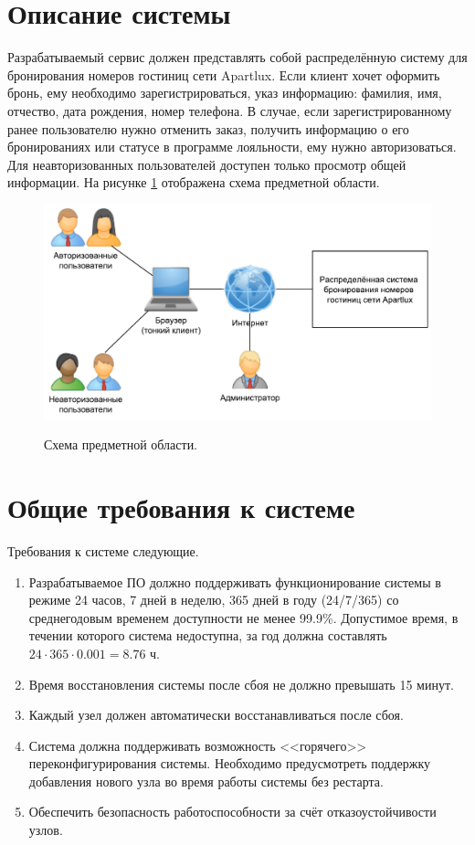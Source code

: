 \section*{Описание системы}
Разрабатываемый сервис должен представлять собой распределённую систему для бронирования номеров гостиниц сети Apartlux. Если клиент хочет оформить бронь, ему необходимо зарегистрироваться, указ информацию: фамилия, имя, отчество, дата рождения, номер телефона. В случае, если зарегистрированному ранее пользователю нужно отменить заказ, получить информацию о его бронированиях или статусе в программе лояльности, ему нужно авторизоваться. Для неавторизованных пользователей доступен только просмотр общей информации. 
На рисунке \ref{fig1:image} отображена схема предметной области.
\begin{figure}[h]
	\begin{center}
		{\includegraphics[scale = 0.6]{img/pic/general.pdf}}
		\caption{Схема предметной области.}
		\label{fig1:image}
	\end{center}
\end{figure}

\pagebreak

\section*{Общие требования к системе}
Требования к системе следующие.
\begin{enumerate}
	\item Разрабатываемое ПО должно поддерживать функционирование системы в режиме 24 часов, 7 дней в неделю, 365 дней в году (24/7/365) со среднегодовым временем доступности не менее 99.9\%. Допустимое время, в течении которого система недоступна, за год должна составлять $24\cdot365\cdot0.001=8.76$ ч.
	
	\item Время восстановления системы после сбоя не должно превышать 15 минут.
	
	\item Каждый узел должен автоматически восстанавливаться после сбоя.
	
	\item Система должна поддерживать возможность <<горячего>> переконфигурирования системы. Необходимо предусмотреть поддержку добавления нового узла во время работы системы без рестарта.
	
	\item Обеспечить безопасность работоспособности за счёт отказоустойчивости узлов.
\end{enumerate}

